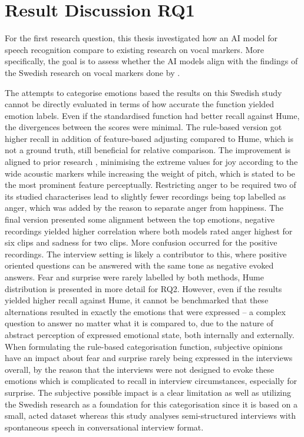 \section{Result Discussion RQ1}

For the first research question, this thesis investigated how an AI model for speech recognition
compare to existing research on vocal markers. More specifically, the goal is to assess whether
the AI models align with the findings of the Swedish research on vocal markers done by \textcite{Ekberg2023}. 

The attempts to categorise emotions based the results on this Swedish study cannot be directly evaluated in terms of how accurate the function yielded emotion labels. Even if the standardised function had better recall against Hume, the divergences between the scores were minimal. 
The rule-based version got higher recall in addition of feature-based adjusting compared to Hume, which is not a ground truth, still beneficial for relative comparison. 
The improvement is aligned to prior research \autocites{Banse1996}{Ekberg2023}, minimising the extreme values for joy according to the wide acoustic markers while increasing the weight of pitch, which is stated to be the most prominent feature perceptually. 
Restricting anger to be required two of its studied characterises lead to slightly fewer recordings being top labelled as anger, which was added by the reason to separate anger from happiness. The final version presented some alignment between the top emotions, negative recordings yielded higher correlation where both models rated anger highest for six clips and sadness for two clips. More confusion occurred for the positive recordings. 
The interview setting is likely a contributor to this, where positive oriented questions can be answered with the same tone as negative evoked answers. 
Fear and surprise were rarely labelled by both methods, Hume distribution is presented in more detail for RQ2. 
However, even if the results yielded higher recall against Hume, it cannot be benchmarked that these alternations resulted in exactly the emotions that were expressed – a complex question to answer no matter what it is compared to, due to the nature of abstract perception of expressed emotional state, both internally and externally. When formulating the rule-based categorisation function, subjective opinions have an impact about fear and surprise rarely being expressed in the interviews overall, 
by the reason that the interviews were not designed to evoke these emotions which is complicated to recall in interview circumstances, especially for surprise. 
The subjective possible impact is a clear limitation as well as utilizing the Swedish research as a foundation for this categorisation since it is based on a small, acted dataset whereas this study analyses semi-structured interviews with spontaneous speech in conversational interview format. 

